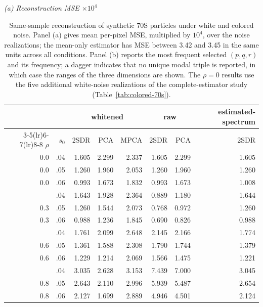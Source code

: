 \begin{table}[tbp]
\centering
\small
\caption{Same-sample reconstruction of synthetic 70S particles under white and colored noise.  Panel (a) gives mean per-pixel MSE, multiplied by $10^4$, over the noise realizations; the mean-only estimator has MSE between 3.42 and 3.45 in the same units across all conditions.  Panel (b) reports the most frequent selected $(p,q,r)$ and its frequency; a dagger indicates that no unique modal triple is reported, in which case the ranges of the three dimensions are shown.  The $\rho=0$ results use the five additional white-noise realizations of the complete-estimator study (Table~\ref{tab:colored-70s}).}
\label{tab:supp-colored-partA}
\textit{(a) Reconstruction MSE $\times10^{4}$}\\[2pt]
\begin{tabular}{rrrrrrrr}
\toprule
 & & \multicolumn{3}{c}{whitened} & \multicolumn{2}{c}{raw} & estimated-spectrum\\
\cmidrule(lr){3-5}\cmidrule(lr){6-7}\cmidrule(lr){8-8}
$\rho$ & $s_0$ & 2SDR & PCA & MPCA & 2SDR & PCA & 2SDR\\
\midrule
0.0 & .04 & 1.605 & 2.299 & 2.337 & 1.605 & 2.299 & 1.605\\
0.0 & .05 & 1.260 & 1.960 & 2.053 & 1.260 & 1.960 & 1.260\\
0.0 & .06 & 0.993 & 1.673 & 1.832 & 0.993 & 1.673 & 1.008\\
\addlinespace
0.3 & .04 & 1.643 & 1.928 & 2.364 & 0.889 & 1.180 & 1.644\\
0.3 & .05 & 1.260 & 1.544 & 2.073 & 0.768 & 0.972 & 1.260\\
0.3 & .06 & 0.988 & 1.236 & 1.845 & 0.690 & 0.826 & 0.988\\
\addlinespace
0.6 & .04 & 1.761 & 2.099 & 2.648 & 2.145 & 2.166 & 1.774\\
0.6 & .05 & 1.361 & 1.588 & 2.308 & 1.790 & 1.744 & 1.379\\
0.6 & .06 & 1.229 & 1.214 & 2.069 & 1.566 & 1.475 & 1.221\\
\addlinespace
0.8 & .04 & 3.035 & 2.628 & 3.153 & 7.439 & 7.000 & 3.045\\
0.8 & .05 & 2.643 & 2.110 & 2.996 & 5.939 & 5.487 & 2.654\\
0.8 & .06 & 2.127 & 1.699 & 2.889 & 4.946 & 4.501 & 2.124\\
\bottomrule
\end{tabular}
\bigskip


\end{table}
